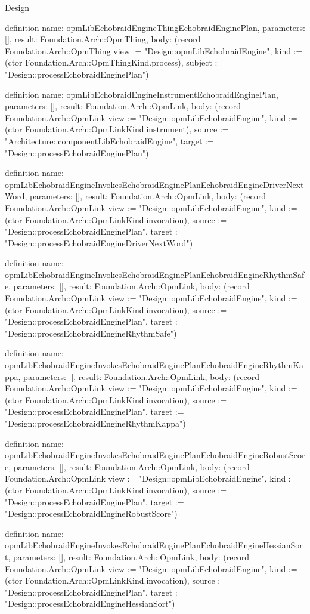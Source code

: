 \begin{lexlean}{Design}
\begin{semanticmodule}
definition{
  name: opmLibEchobraidEngineThingEchobraidEnginePlan,
  parameters: [],
  result: Foundation.Arch::OpmThing,
  body: (record Foundation.Arch::OpmThing {view := "Design::opmLibEchobraidEngine", kind := (ctor Foundation.Arch::OpmThingKind.process), subject := "Design::processEchobraidEnginePlan"})
}

definition{
  name: opmLibEchobraidEngineInstrumentEchobraidEnginePlan,
  parameters: [],
  result: Foundation.Arch::OpmLink,
  body: (record Foundation.Arch::OpmLink {view := "Design::opmLibEchobraidEngine", kind := (ctor Foundation.Arch::OpmLinkKind.instrument), source := "Architecture::componentLibEchobraidEngine", target := "Design::processEchobraidEnginePlan"})
}

definition{
  name: opmLibEchobraidEngineInvokesEchobraidEnginePlanEchobraidEngineDriverNextWord,
  parameters: [],
  result: Foundation.Arch::OpmLink,
  body: (record Foundation.Arch::OpmLink {view := "Design::opmLibEchobraidEngine", kind := (ctor Foundation.Arch::OpmLinkKind.invocation), source := "Design::processEchobraidEnginePlan", target := "Design::processEchobraidEngineDriverNextWord"})
}

definition{
  name: opmLibEchobraidEngineInvokesEchobraidEnginePlanEchobraidEngineRhythmSafe,
  parameters: [],
  result: Foundation.Arch::OpmLink,
  body: (record Foundation.Arch::OpmLink {view := "Design::opmLibEchobraidEngine", kind := (ctor Foundation.Arch::OpmLinkKind.invocation), source := "Design::processEchobraidEnginePlan", target := "Design::processEchobraidEngineRhythmSafe"})
}

definition{
  name: opmLibEchobraidEngineInvokesEchobraidEnginePlanEchobraidEngineRhythmKappa,
  parameters: [],
  result: Foundation.Arch::OpmLink,
  body: (record Foundation.Arch::OpmLink {view := "Design::opmLibEchobraidEngine", kind := (ctor Foundation.Arch::OpmLinkKind.invocation), source := "Design::processEchobraidEnginePlan", target := "Design::processEchobraidEngineRhythmKappa"})
}

definition{
  name: opmLibEchobraidEngineInvokesEchobraidEnginePlanEchobraidEngineRobustScore,
  parameters: [],
  result: Foundation.Arch::OpmLink,
  body: (record Foundation.Arch::OpmLink {view := "Design::opmLibEchobraidEngine", kind := (ctor Foundation.Arch::OpmLinkKind.invocation), source := "Design::processEchobraidEnginePlan", target := "Design::processEchobraidEngineRobustScore"})
}

definition{
  name: opmLibEchobraidEngineInvokesEchobraidEnginePlanEchobraidEngineHessianSort,
  parameters: [],
  result: Foundation.Arch::OpmLink,
  body: (record Foundation.Arch::OpmLink {view := "Design::opmLibEchobraidEngine", kind := (ctor Foundation.Arch::OpmLinkKind.invocation), source := "Design::processEchobraidEnginePlan", target := "Design::processEchobraidEngineHessianSort"})
}


\end{semanticmodule}
\end{lexlean}
